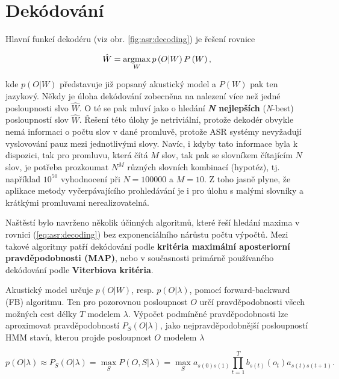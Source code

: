 \section{Dekódování}
\label{chap:asr:decoding}

Hlavní funkcí dekodéru (viz obr. \ref{fig:asr:decoding}) je řešení rovnice

\begin{equation}
  \hat{W} = \operatorname*{argmax}_{W} p\left(O | W\right)P\left(W\right),
  \label{eq:asr:decoding:decoder}
\end{equation}

\noindent kde $p\left(O|W\right)$ představuje již popsaný akustický model a $P\left(W\right)$ pak ten jazykový. Někdy je úloha dekódování zobecněna na nalezení více než jedné posloupnosti slvo $\hat{W}$. O té se pak mluví jako o hledání \textbf{\textit{N} nejlepších} (\textit{N}-best) posloupností slov $\hat{W}$.  Řešení této úlohy je netriviální, protože dekodér obvykle nemá informaci o počtu slov v dané promluvě, protože ASR systémy nevyžadují vyslovování pauz mezi jednotlivými slovy. Navíc, i kdyby tato informace byla k dispozici, tak pro promluvu, která čítá $M$ slov, tak pak se slovníkem čítajícím $N$ slov, je potřeba prozkoumat $N^{M}$ různých slovních kombinací (hypotéz), tj. například $10^{50}$ vyhodnocení při $N=100000$ a $M=10$. Z toho jasně plyne, že aplikace metody vyčerpávajícího prohledávání je i pro úlohu s malými slovníky a krátkými promluvami nerealizovatelná.

Naštěstí bylo navrženo několik účinných algoritmů, které řeší hledání maxima v rovnici (\ref{eq:asr:decoding}) bez exponenciálního nárůstu počtu výpočtů. Mezi takové algoritmy patří dekódování podle \textbf{kritéria maximální aposteriorní pravděpodobnosti (MAP)}, nebo v současnosti primárně používaného dekódování podle \textbf{Viterbiova kritéria}.

Akustický model určuje $p\left(O|W\right)$, resp. $p\left(O|\lambda\right)$, pomocí forward-backward (FB) algoritmu. Ten pro pozorovnou posloupnost $O$ určí pravděpodobnosti všech možných cest délky $T$ modelem $\lambda$. Výpočet podmíněné pravděpodobnosti lze aproximovat pravděpodobností $P_S(O|\lambda)$, jako nejpravděpodobnější posloupností HMM stavů, kterou projde posloupnost $O$ modelem $\lambda$

\begin{equation}
  p\left(O|\lambda\right) \approx P_S\left(O|\lambda\right) = \max_S P\left(O, S| \lambda \right) = \max_S a_{s\left(0\right)s\left(1\right)} \prod_{t=1}^{T} b_{s\left(t\right)}\left(o_t\right) a_{s\left(t\right)s\left(t+1\right)}.
  \label{eq:asr:decoding:approx}
\end{equation}

